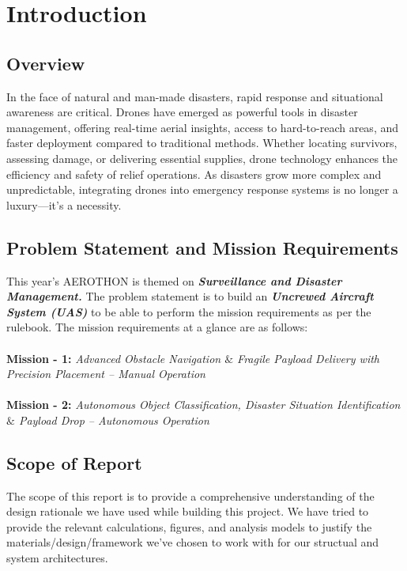 \documentclass[12pt]{report}
\begin{document}
  \tableofcontents
  \newpage


  \chapter{Introduction}
  \section{Overview}

   In the face of natural and man-made disasters, rapid response and situational awareness are critical. Drones have emerged as powerful tools in disaster management, offering real-time aerial insights, access to hard-to-reach areas, and faster deployment compared to traditional methods. Whether locating survivors, assessing damage, or delivering essential supplies, drone technology enhances the efficiency and safety of relief operations. As disasters grow more complex and unpredictable, integrating drones into emergency response systems is no longer a luxury—it's a necessity.

    \section{Problem Statement and Mission Requirements}
    This year's AEROTHON is themed on \textbf{\textit{Surveillance and Disaster Management.}} The problem statement is to build an \textbf{\textit{Uncrewed Aircraft System (UAS)}} to be able to perform the mission requirements as per the rulebook. The mission requirements at a glance are as follows: \\ \\
    \textbf{Mission - 1:} \textit{Advanced Obstacle Navigation $\&$ Fragile Payload Delivery with Precision Placement – Manual Operation} \\ \\
    \textbf{Mission - 2:} \textit{Autonomous Object Classification, Disaster Situation Identification $\&$ Payload Drop – Autonomous Operation} 



    \section{Scope of Report}
    The scope of this report is to provide a comprehensive understanding of the design rationale we have used while building this project. We have tried to provide the relevant calculations, figures, and analysis models to justify the materials/design/framework we've chosen to work with for our structual and system architectures. \\ 
\end{document}
